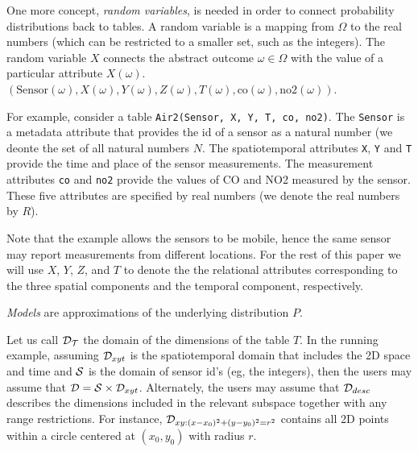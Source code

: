 One more concept, {\em random variables}, is needed in order to
connect probability distributions back to tables. A random variable is
a mapping from $\Omega$ to the real numbers (which can be restricted
to a smaller set, such as the integers). The random variable $X$ connects
the abstract outcome $\omega \in \Omega$ with the value of a
particular attribute $X(\omega)$.
$(\mbox{Sensor}(\omega),X(\omega),Y(\omega),Z(\omega),T(\omega),\mbox{co}(\omega),\mbox{no2}(\omega))$.

For example, consider a table \texttt{Air2(Sensor, X, Y, T, co,
  no2)}. The \texttt{Sensor} is a metadata attribute that provides the
id of a sensor as a natural number (we deonte the set of all natural
numbers $N$. The spatiotemporal attributes \texttt{X}, \texttt{Y}
and \texttt{T} provide the time and place of the sensor
measurements. The measurement attributes \texttt{co} and \texttt{no2}
provide the values of CO and NO2 measured by the sensor. These five
attributes are specified by real numbers (we denote the real numbers
by $R$).

Note that the example allows the sensors to be mobile, hence the
same sensor may report measurements from different locations. For the
rest of this paper we will use $X$, $Y$, $Z$, and $T$ to denote the 
the relational attributes corresponding to the three spatial
components and the temporal component, respectively.


{\em Models} are approximations of the underlying distribution $P$.


Let us call ${\cal D_T}$ the domain of the dimensions of the table
$T$. In the running example, assuming ${\cal D}_{xyt}$ is the
spatiotemporal domain that includes the 2D space and time and ${\cal
  S}$ is the domain of sensor id's (eg, the integers), then the users
may assume that ${\cal D} = {\cal S} \times {\cal
  D}_{xyt}$. Alternately, the users may assume that ${\cal D}_{desc}$
describes the dimensions included in the relevant subspace together
with any range restrictions. For instance, ${\cal D}_{xy:
  (x-x_0)^2+(y-y_0)^2 = r^2}$ contains all 2D points within a circle
centered at $(x_0, y_0)$ with radius $r$. \\

